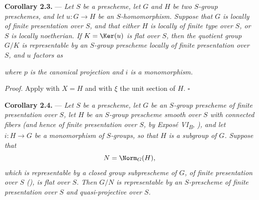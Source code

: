 \medskip
\noindent{}%
\textbf{Corollary 2.3.} --- \textit{Let \(S\) be a prescheme, let
\(G\) and \(H\) be two \(S\)-group preschemes, and let
\(u:G\to H\) be an \(S\)-homomorphism. Suppose that \(G\) is locally
of finite presentation over \(S\), and that either \(H\) is locally
of finite type over \(S\), or \(S\) is locally noetherian. If
\(K=\Ker(u)\) is flat over \(S\), then the quotient group \(G/K\)
is representable by an \(S\)-group prescheme locally of finite
presentation over \(S\), and \(u\) factors as}
\begin{center}


\end{center}
\textit{where \(p\) is the canonical projection and \(i\) is a
monomorphism.}

\medskip
\noindent\textit{Proof.}
Apply  with \(X=H\) and with \(\xi\) the unit section of \(H\).
\hfill\(\square\)

\medskip
\noindent{}%
\textbf{Corollary 2.4.} --- \textit{Let \(S\) be a prescheme, let
\(G\) be an \(S\)-group prescheme of finite presentation over
\(S\), let \(H\) be an \(S\)-group prescheme smooth over \(S\) with
connected fibers (and hence of finite presentation over \(S\), by
Exposé VI\textsubscript{B}, ), and let \(i:H\to G\) be a
monomorphism of \(S\)-groups, so that \(H\) is a subgroup of \(G\).
Suppose that}
\[
  N=\Norm_G(H),
\]
\textit{which is representable by a closed group subprescheme of
\(G\), of finite presentation over \(S\) (), is flat
over \(S\). Then \(G/N\) is representable by an \(S\)-prescheme of
finite presentation over \(S\) and quasi-projective over \(S\).}

